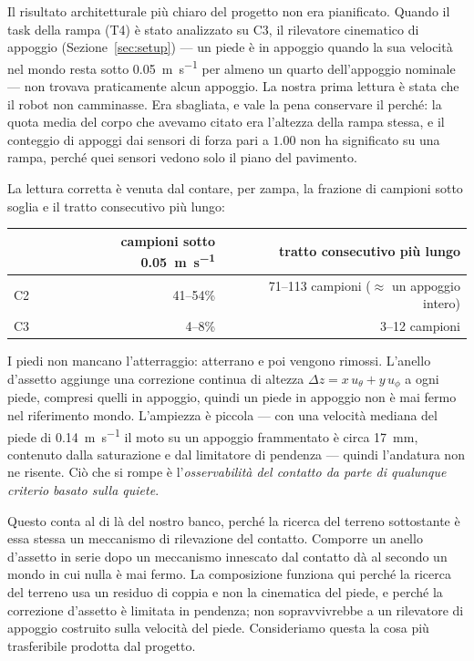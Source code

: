 \documentclass[11pt,a4paper]{article}
\newcommand{\Ct}{\textsf{C2}}
\newcommand{\Cth}{\textsf{C3}}
\begin{document}
Il risultato architetturale pi\`u chiaro del progetto non era pianificato.
Quando il task della rampa (T4) \`e stato analizzato su \Cth, il rilevatore
cinematico di appoggio (Sezione~\ref{sec:setup}) --- un piede \`e in appoggio
quando la sua velocit\`a nel mondo resta sotto \SI{0.05}{\meter\per\second} per
almeno un quarto dell'appoggio nominale --- non trovava praticamente alcun
appoggio. La nostra prima lettura \`e stata che il robot non camminasse. Era
sbagliata, e vale la pena conservare il perch\'e: la quota media del corpo che
avevamo citato era l'altezza della rampa stessa, e il conteggio di appoggi dai
sensori di forza pari a $1.00$ non ha significato su una rampa, perch\'e quei
sensori vedono solo il piano del pavimento.

La lettura corretta \`e venuta dal contare, per zampa, la frazione di campioni
sotto soglia e il tratto consecutivo pi\`u lungo:

\begin{center}
\small
\begin{tabular}{@{}lrr@{}}
\toprule
 & campioni sotto \SI{0.05}{\meter\per\second} & tratto consecutivo pi\`u lungo \\
\midrule
\Ct  & 41--54\% & 71--113 campioni ($\approx$ un appoggio intero) \\
\Cth & 4--8\%   & 3--12 campioni \\
\bottomrule
\end{tabular}
\end{center}

I piedi non mancano l'atterraggio: atterrano e poi vengono rimossi. L'anello
d'assetto aggiunge una correzione continua di altezza
$\Delta z = x\,u_\theta + y\,u_\phi$ a ogni piede, compresi quelli in appoggio,
quindi un piede in appoggio non \`e mai fermo nel riferimento mondo.
L'ampiezza \`e piccola --- con una velocit\`a mediana del piede di
\SI{0.14}{\meter\per\second} il moto su un appoggio frammentato \`e circa
\SI{17}{\milli\meter}, contenuto dalla saturazione e dal limitatore di
pendenza --- quindi l'andatura non ne risente. Ci\`o che si rompe \`e
l'\emph{osservabilit\`a del contatto da parte di qualunque criterio basato sulla
quiete}.

Questo conta al di l\`a del nostro banco, perch\'e la ricerca del terreno
sottostante \`e essa stessa un meccanismo di rilevazione del contatto. Comporre
un anello d'assetto in serie dopo un meccanismo innescato dal contatto d\`a al
secondo un mondo in cui nulla \`e mai fermo. La composizione funziona qui perch\'e
la ricerca del terreno usa un residuo di coppia e non la cinematica del piede,
e perch\'e la correzione d'assetto \`e limitata in pendenza; non sopravvivrebbe a
un rilevatore di appoggio costruito sulla velocit\`a del piede. Consideriamo
questa la cosa pi\`u trasferibile prodotta dal progetto.
\end{document}
